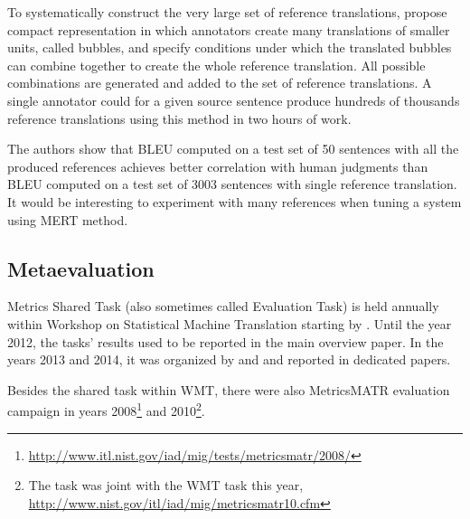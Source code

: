 To systematically construct the very large set of reference translations,
 propose compact representation in which
annotators create many translations of smaller units, called bubbles, and
specify conditions under which the translated bubbles can combine together to
create the whole reference translation. All possible combinations are generated
and added to the set of reference translations. A single annotator could for a
given source sentence produce hundreds of thousands reference translations
using this method in two hours of work. 

The authors show that BLEU computed on a test set of 50 sentences with all the
produced references achieves better correlation with human judgments than BLEU
computed on a test set of 3003 sentences with single reference translation. It
would be interesting to experiment with many references when tuning a system
using MERT method.

\subsection{Metaevaluation}

Metrics Shared Task (also sometimes called Evaluation Task) is held annually
within Workshop on Statistical Machine Translation starting by
. Until the year 2012, the tasks' results used to be reported
in the main overview paper.  In the years 2013 and 2014, it was organized by
 and  and reported in dedicated
papers. 

Besides the shared task within WMT, there were also MetricsMATR evaluation
campaign in years
2008\footnote{\url{http://www.itl.nist.gov/iad/mig/tests/metricsmatr/2008/}}
and
2010\footnote{The task was joint with the WMT task this year, \url{http://www.nist.gov/itl/iad/mig/metricsmatr10.cfm}}.

